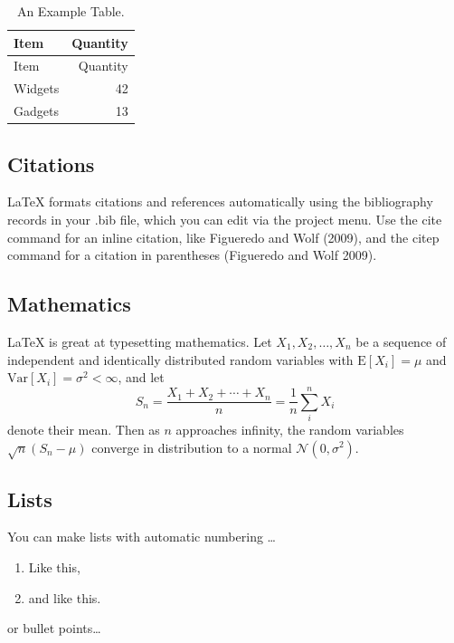 \documentclass[fleqn,10pt,lineno]{wlpeerj} %
\providecommand{\tightlist}{
\setlength{\itemsep}{0pt}\setlength{\parskip}{0pt}}
\theoremstyle{definition}
\theoremstyle{definition}
\theoremstyle{definition}
\theoremstyle{remark}
\begin{document}
\begin{longtable}[]{@{}lr@{}}
\caption{\label{tab:widgets} An Example Table.}\tabularnewline
\toprule
Item & Quantity\tabularnewline
\midrule
\endfirsthead
\toprule
Item & Quantity\tabularnewline
\midrule
\endhead
Widgets & 42\tabularnewline
Gadgets & 13\tabularnewline
\bottomrule
\end{longtable}

\subsection*{Citations}\label{citations}

LaTeX formats citations and references automatically using the
bibliography records in your .bib file, which you can edit via the
project menu. Use the cite command for an inline citation, like
Figueredo and Wolf (2009), and the citep command for a citation in
parentheses (Figueredo and Wolf 2009).

\subsection*{Mathematics}\label{mathematics}

\LaTeX{} is great at typesetting mathematics. Let
\(X_1, X_2, \ldots, X_n\) be a sequence of independent and identically
distributed random variables with \(\text{E}[X_i] = \mu\) and
\(\text{Var}[X_i] = \sigma^2 < \infty\), and let
\[S_n = \frac{X_1 + X_2 + \cdots + X_n}{n}
      = \frac{1}{n}\sum_{i}^{n} X_i\] denote their mean. Then as \(n\)
approaches infinity, the random variables \(\sqrt{n}(S_n - \mu)\)
converge in distribution to a normal \(\mathcal{N}(0, \sigma^2)\).

\subsection*{Lists}\label{lists}

You can make lists with automatic numbering \dots

\begin{enumerate}
\def\labelenumi{\arabic{enumi}.}
\tightlist
\item
  Like this,
\item
  and like this.
\end{enumerate}

or bullet points\ldots{}
\end{document}

